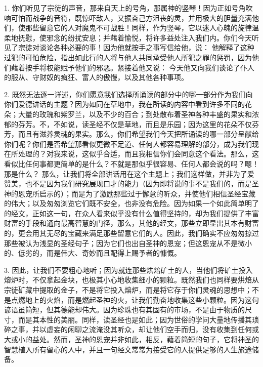 1. 你们听见了宗徒的声音，那来自天上的号角，那属神的竖琴！因为正如号角吹响可怕而战争的音符，既惊吓敌人，又振奋己方沮丧的灵，并用极大的胆量充满他们，使那些留意它的人对魔鬼不可战胜！同样，作为竖琴，它以迷人心魄的旋律温柔地抚慰，使邪念的纷扰安息；并藉着愉悦，将许多益处注入我们内。你们今天听见了宗徒对谈论各种必要的事！因为他就按手之事写信给他，说：  他解释了这种过犯的可怕危险，指出如此行的人将与他人共同承受他人所犯之罪的惩罚，因为他们藉着按手将权能赋予他们的邪恶。紧接着他又说： 今天他又向我们谈论了仆人的服从、守财奴的疯狂、富人的傲慢，以及其他各种事项。\par

2. 既然无法逐一详述，你们愿意我们选择所诵读的部分中的哪一部分作为我们向你们爱德讲话的主题？因为如同在草地中，我在所读的内容中看到许多不同的花朵；大量的玫瑰和紫罗兰，以及不少的百合；到处散布着圣神各种丰盛的果实和浓郁的芬芳。不，不如说，读圣经不仅是草地，而且是乐园；因为这里的花朵不仅芬芳，而且有滋养灵魂的果实。那么，你们希望我们今天把所诵读的哪一部分呈献给你们呢？你们是否希望那看似更微不足道、任何人都容易理解的部分，成为我们现在所处理的？对我来说，这似乎合适，而且我相信你们会同意这个看法。那么，这看似比任何事都更简单的是什么？不就是那似乎很容易、任何人都会说的吗？嗯！那是什么？ 那么，让我们将全部讲话用在这个主题上；我们这样做，并非为了爱赞美，也不是因为我们研究展现口才的能力（因为即将说的事不是我们的，而是圣神的恩宠所启示的）；而是为了激励那些过于懈怠的听众，并使他们相信圣经宝藏的伟大；以及匆匆浏览它们既不安全，也非没有危险。因为如果一个如此简单明了的经文，正如这一句，在众人看来似乎没有什么值得坚持的，却为我们提供了丰富财富的手段和通向最高智慧的门径，那么，其他的经文，那些立即显出其本有财富的，更会用其无尽的宝藏来满足那些留意它们的人。因此，我们确实不应匆匆掠过那些被认为浅显的圣经句子；因为它们也出自圣神的恩宠；但这恩宠从不是微小的、低劣的，而是伟大、奇妙而且配得上赐予者的慷慨。\par

3. 因此，让我们不要粗心地听；因为就连那些烘焙矿土的人，当他们将矿土投入熔炉时，不仅拿起金块，也极其小心地收集细小的颗粒。既然我们也同样要烘焙从宗徒矿藏中提取的金子，不是将它投入熔炉，而是将它存于你们灵魂的思想中；不是点燃地上的火焰，而是燃起圣神的火，让我们勤奋地收集这些小颗粒。因为这句谚语虽简短，但其德能却伟大。因为珍珠也有其固有的市场，不是由于物质的尺寸，而是其本性的美丽。同样，读圣经也是如此；因为世俗的学问大量地传播其琐碎之事，并以虚妄的闲聊之流淹没其听众，却让他们空手而归，没有收集到任何或大或小的益处。然而，圣神的恩宠并非如此，相反，藉着简短的句子，它将神圣的智慧植入所有留心的人中，并且一句经文常常为接受它的人提供足够的人生旅途储备。\par

